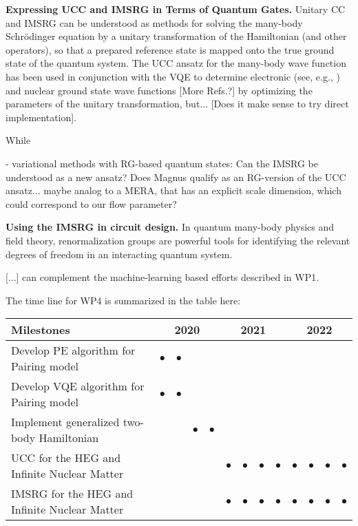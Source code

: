 \documentclass[10pt]{article}
\newcommand{\tbd}[1]{{\color{red}#1}}
\begin{document}
\textbf{Expressing UCC and IMSRG in Terms of Quantum Gates.} Unitary CC and IMSRG can be understood as methods for solving the many-body Schr\"odinger equation by a unitary transformation of the Hamiltonian (and other operators), so that a prepared reference state is mapped onto the true ground state of the quantum system. The UCC ansatz for the many-body wave function has been used in conjunction with the VQE to determine electronic (see, e.g., \cite{Wecker:2015bk,McClean:2016qr,Lee:2019dd}) and nuclear ground state wave functions \cite{Dumitrescu:2018az,Lu:2018aq} \tbd{[More Refs.?]} by optimizing the parameters of the unitary transformation, \tbd{but... [Does it make sense to try direct implementation]}. 

While 

\tbd{\cite{Dawson:2008td} - variational methods with RG-based quantum states: Can the IMSRG be understood as a new ansatz? Does Magnus qualify as an RG-version of the UCC ansatz... maybe analog to a MERA, that has an explicit scale dimension, which could correspond to our flow parameter?}

\textbf{Using the IMSRG in circuit design.} In quantum many-body physics and field theory, renormalization groups are powerful tools for identifying the relevant degrees of freedom in an interacting quantum system. 

\tbd{[...] can complement the machine-learning based efforts described in WP1.}

The time line for WP4 is summarized in the table here:
\begin{footnotesize}
\begin{center}
\begin{tabular}{|l|c|c|c|c|c|c|c|c|c|c|c|c|}
\hline
\multicolumn{1}{|l}{Milestones } & \multicolumn{4}{|c|}{ 2020 } & \multicolumn{4}{c|}{ 2021 } & \multicolumn{4}{c|}{ 2022 } \\
\hline
Develop PE algorithm for Pairing model &$\bullet$ &$\bullet$ && & & & & & & & &  \\
\hline
Develop VQE algorithm for Pairing model &$\bullet$  & $\bullet$ & & &  & & & & & &  \\
\hline
Implement generalized two-body Hamiltonian & & &$\bullet$  & $\bullet$ & & & & & & & &  \\

\hline
UCC for the HEG and Infinite Nuclear Matter & && & &$\bullet$  &$\bullet$ &$\bullet$  &$\bullet$  &$\bullet$  &$\bullet$ &$\bullet$  &$\bullet$   \\
\hline
IMSRG for the HEG and Infinite Nuclear Matter & && & &$\bullet$  &$\bullet$ &$\bullet$  &$\bullet$  &$\bullet$  &$\bullet$ &$\bullet$  &$\bullet$   \\
\hline

\end{tabular}
\end{center}
\end{footnotesize}
\end{document}
